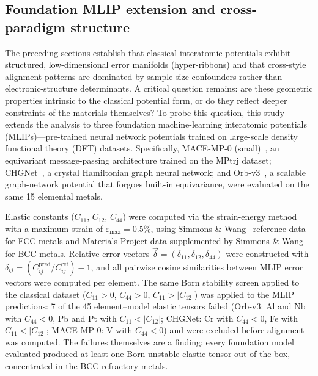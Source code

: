 
\subsection{Foundation MLIP extension and cross-paradigm structure}
\label{subsec:foundation_mlip}

The preceding sections establish that classical interatomic potentials exhibit structured, low-dimensional error manifolds (hyper-ribbons) and that cross-style alignment patterns are dominated by sample-size confounders rather than electronic-structure determinants. A critical question remains: are these geometric properties intrinsic to the classical potential form, or do they reflect deeper constraints of the materials themselves? To probe this question, this study extends the analysis to three foundation machine-learning interatomic potentials (MLIPs)---pre-trained neural network potentials trained on large-scale density functional theory (DFT) datasets. Specifically, MACE-MP-0 (small)~\cite{batatia2024}, an equivariant message-passing architecture trained on the MPtrj dataset; CHGNet~\cite{deng2023}, a crystal Hamiltonian graph neural network; and Orb-v3~\cite{rhodes2025}, a scalable graph-network potential that forgoes built-in equivariance, were evaluated on the same 15 elemental metals.

Elastic constants ($C_{11}$, $C_{12}$, $C_{44}$) were computed via the strain-energy method with a maximum strain of $\varepsilon_{\max} = 0.5\%$, using Simmons \& Wang~\cite{simmons1971} reference data for FCC metals and Materials Project data supplemented by Simmons \& Wang for BCC metals. Relative-error vectors $\vec{\delta} = (\delta_{11}, \delta_{12}, \delta_{44})$ were constructed with $\delta_{ij} = (C_{ij}^{\text{pred}} / C_{ij}^{\text{ref}}) - 1$, and all pairwise cosine similarities between MLIP error vectors were computed per element. The same Born stability screen applied to the classical dataset ($C_{11}>0$, $C_{44}>0$, $C_{11}>|C_{12}|$) was applied to the MLIP predictions: 7 of the 45 element--model elastic tensors failed (Orb-v3: Al and Nb with $C_{44}<0$, Pb and Pt with $C_{11}<|C_{12}|$; CHGNet: Cr with $C_{44}<0$, Fe with $C_{11}<|C_{12}|$; MACE-MP-0: V with $C_{44}<0$) and were excluded before alignment was computed. The failures themselves are a finding: every foundation model evaluated produced at least one Born-unstable elastic tensor out of the box, concentrated in the BCC refractory metals.

